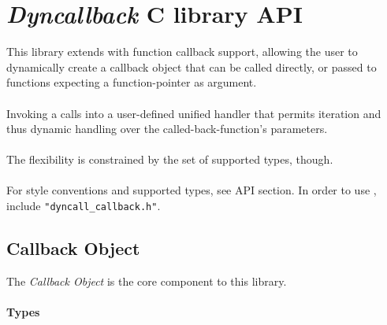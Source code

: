 %
%
%
%

\newpage
\section{\emph{Dyncallback} C library API}

This library extends  with function callback support, allowing
the user to dynamically create a callback object that can be called directly,
or passed to functions expecting a function-pointer as argument.\\
\\
Invoking a  calls into a user-defined unified handler that 
permits iteration and thus dynamic handling over the called-back-function's
parameters.\\
\\
The flexibility is constrained by the set of supported types, though.\\
\\
For style conventions and supported types, see  API section.
In order to use , include {\tt "dyncall\_callback.h"}.

\subsection{Callback Object}

The \emph{Callback Object} is the core component to this library.

\paragraph{Types}

